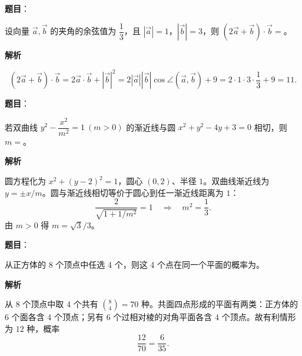 \begin{answer}

\textbf{题目}：

设向量 $\vec a,\vec b$ 的夹角的余弦值为 $\dfrac13$，且 $|\vec a|=1$，$|\vec b|=3$，则 $(2\vec a+\vec b)\cdot\vec b=$\gkblank{}。

\textbf{解析}

\nopagebreak[4]
\[
(2\vec a+\vec b)\cdot\vec b=2\vec a\cdot\vec b+|\vec b|^2
=2|\vec a||\vec b|\cos\angle(\vec a,\vec b)+9
=2\cdot1\cdot3\cdot\frac13+9=11.
\]


\end{answer}
\begin{answer}

\textbf{题目}：

若双曲线 $y^2-\dfrac{x^2}{m^2}=1\ (m>0)$ 的渐近线与圆 $x^2+y^2-4y+3=0$ 相切，则 $m=$\gkblank{}。

\textbf{解析}

圆方程化为 $x^2+(y-2)^2=1$，圆心 $(0,2)$、半径 $1$。双曲线渐近线为 $y=\pm x/m$。圆与渐近线相切等价于圆心到任一渐近线距离为 $1$：
\nopagebreak[4]
\[
\frac{2}{\sqrt{1+1/m^2}}=1\quad\Longrightarrow\quad m^2=\frac13.
\]
由 $m>0$ 得 $m=\sqrt3/3$。


\end{answer}
\begin{answer}

\textbf{题目}：

从正方体的 8 个顶点中任选 4 个，则这 4 个点在同一个平面的概率为\gkblank{}。

\textbf{解析}

从 8 个顶点中取 4 个共有 $\binom84=70$ 种。共面四点形成的平面有两类：正方体的 6 个面各含 4 个顶点；另有 6 个过相对棱的对角平面各含 4 个顶点。故有利情形为 $12$ 种，概率
\nopagebreak[4]
\[
\frac{12}{70}=\frac6{35}.
\]


\end{answer}
